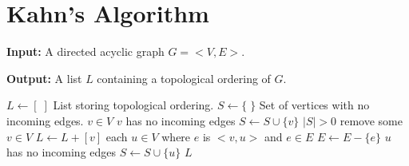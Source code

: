 \section{Kahn's Algorithm}

\noindent
\textbf{Input:} A directed acyclic graph $G = <V, E>$.

\noindent
\textbf{Output:} A list $L$ containing a topological ordering of $G$.

\begin{codebox}
  \li $L \gets [\;]$ \>\>\Comment List storing topological ordering.
  \li $S \gets \{\;\}$ \>\>\Comment Set of vertices with no incoming edges.
  \li \For $v \in V$
  \li \Then \If $v$ has no incoming edges
  \li       \Then $S \gets S \cup \{ v \}$
            \End
      \End
  \li \While $\lvert S \rvert > 0$
  \li \Then remove some $v \in V$
  \li       $L \gets L + [ v ]$
  \li       \For each $u \in V$ where $e$ is $<v,u>$ and $e \in E$
  \li       \Then $E \gets E - \{ e \}$
  \li             \If $u$ has no incoming edges
  \li             \Then $S \gets S \cup \{ u \}$
                  \End
            \End
      \End
  \li \Return $L$
\end{codebox}
